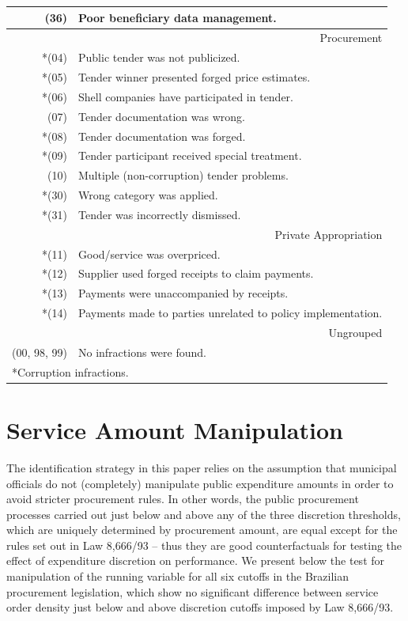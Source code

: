 \documentclass[11pt]{article}
\begin{document}
\begin{table}[!htbp]
\begin{tabular}{r|l}
   (36) & Poor beneficiary data management. \\
  \hline
  \multicolumn{2}{r}{Procurement} \\
  \hline
  *(04) & Public tender was not publicized. \\
  *(05) & Tender winner presented forged price estimates. \\
  *(06) & Shell companies have participated in tender. \\
   (07) & Tender documentation was wrong. \\
  *(08) & Tender documentation was forged. \\
  *(09) & Tender participant received special treatment. \\
   (10) & Multiple (non-corruption) tender problems. \\
  *(30) & Wrong category was applied. \\
  *(31) & Tender was incorrectly dismissed. \\
  \hline
  \multicolumn{2}{r}{Private Appropriation} \\
  \hline
  *(11) & Good/service was overpriced. \\
  *(12) & Supplier used forged receipts to claim payments. \\
  *(13) & Payments were unaccompanied by receipts. \\
  *(14) & Payments made to parties unrelated to policy implementation. \\
  \hline
  \multicolumn{2}{r}{Ungrouped} \\
  \hline
  (00, 98, 99) & No infractions were found. \\
  \hline

  \hline
  \multicolumn{2}{l}{*Corruption infractions.}
  \end{tabular}
\end{table}

\newpage

\section{Service Amount Manipulation}\label{sec:appendixC}

The identification strategy in this paper relies on the assumption that municipal officials do not (completely) manipulate public expenditure amounts in order to avoid stricter procurement rules. In other words, the public procurement processes carried out just below and above any of the three discretion thresholds, which are uniquely determined by procurement amount, are equal except for the rules set out in Law 8,666/93 -- thus they are good counterfactuals for testing the effect of expenditure discretion on performance. We present below the \citet{McCraryManipulationrunningvariable2008} test for manipulation of the running variable for all six cutoffs in the Brazilian procurement legislation, which show no significant difference between service order density just below and above discretion cutoffs imposed by Law 8,666/93.
\end{document}
